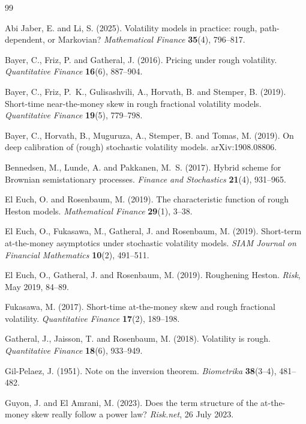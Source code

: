 \documentclass[11pt]{article}
\begin{document}
\begin{thebibliography}{99}

 Abi Jaber, E. and Li, S. (2025).
Volatility models in practice: rough, path-dependent, or Markovian?
\emph{Mathematical Finance} \textbf{35}(4), 796--817.

 Bayer, C., Friz, P. and Gatheral, J. (2016).
Pricing under rough volatility.
\emph{Quantitative Finance} \textbf{16}(6), 887--904.

 Bayer, C., Friz, P.~K., Gulisashvili, A., Horvath, B. and Stemper, B. (2019).
Short-time near-the-money skew in rough fractional volatility models.
\emph{Quantitative Finance} \textbf{19}(5), 779--798.

 Bayer, C., Horvath, B., Muguruza, A., Stemper, B. and Tomas, M. (2019).
On deep calibration of (rough) stochastic volatility models. arXiv:1908.08806.

 Bennedsen, M., Lunde, A. and Pakkanen, M.~S. (2017).
Hybrid scheme for Brownian semistationary processes.
\emph{Finance and Stochastics} \textbf{21}(4), 931--965.

 El Euch, O. and Rosenbaum, M. (2019).
The characteristic function of rough Heston models.
\emph{Mathematical Finance} \textbf{29}(1), 3--38.

 El Euch, O., Fukasawa, M., Gatheral, J. and Rosenbaum, M. (2019).
Short-term at-the-money asymptotics under stochastic volatility models.
\emph{SIAM Journal on Financial Mathematics} \textbf{10}(2), 491--511.

 El Euch, O., Gatheral, J. and Rosenbaum, M. (2019).
Roughening Heston. \emph{Risk}, May 2019, 84--89.

 Fukasawa, M. (2017).
Short-time at-the-money skew and rough fractional volatility.
\emph{Quantitative Finance} \textbf{17}(2), 189--198.

 Gatheral, J., Jaisson, T. and Rosenbaum, M. (2018).
Volatility is rough. \emph{Quantitative Finance} \textbf{18}(6), 933--949.

 Gil-Pelaez, J. (1951).
Note on the inversion theorem. \emph{Biometrika} \textbf{38}(3--4), 481--482.

 Guyon, J. and El Amrani, M. (2023).
Does the term structure of the at-the-money skew really follow a power law?
\emph{Risk.net}, 26 July 2023.


\end{thebibliography}
\end{document}
